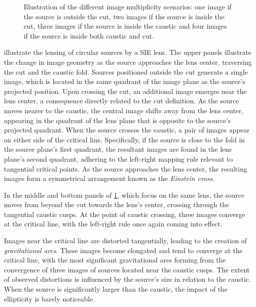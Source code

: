 \begin{figure}
\begin{minipage}{0.5\linewidth}
  \end{minipage} 
  \caption[Image multiplicity for a SIE lens]{Illustration of the different image multiplicity scenarios: \protect{} one image if the source is outside the cut, \protect{} two images if the source is inside the cut, \protect{} three images if the source is inside the caustic and \protect{} four images if the source is inside both caustic and cut.}
  \label{fig:sie}
\end{figure}

 illustrate the lensing of circular sources by a SIE lens.
The upper panels illustrate the change in image geometry as the source approaches the lens center, traversing the cut and the caustic fold. Sources positioned outside the cut generate a single image, which is located in the same quadrant of the image plane as the source's projected position. Upon crossing the cut, an additional image emerges near the lens center, a consequence directly related to the cut definition. As the source moves nearer to the caustic, the central image shifts away from the lens center, appearing in the quadrant of the lens plane that is opposite to the source's projected quadrant. When the source crosses the caustic, a pair of images appear on either side of the critical line. Specifically, if the source is close to the fold in the source plane's first quadrant, the resultant images are found in the lens plane's second quadrant, adhering to the left-right mapping rule relevant to tangential critical points. As the source approaches the lens center, the resulting images form a symmetrical arrangement known as the \emph{Einstein cross}.

In the middle and bottom panels of \cref{fig:sie}, which focus on the same lens, the source moves from beyond the cut towards the lens's center, crossing through the tangential caustic cusps. At the point of caustic crossing, three images converge at the critical line, with the left-right rule once again coming into effect.

Images near the critical line are distorted tangentially, leading to the creation of \emph{gravitational arcs}. These images become elongated and tend to converge at the critical line, with the most significant gravitational arcs forming from the convergence of three images of sources located near the caustic cusps. The extent of observed distortions is influenced by the source's size in relation to the caustic. When the source is significantly larger than the caustic, the impact of the ellipticity is barely noticeable.

